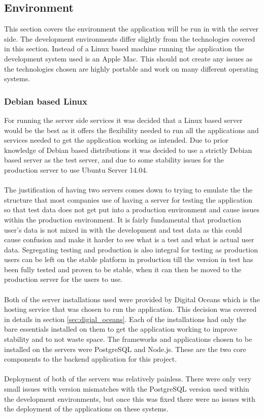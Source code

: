 \subsection{Environment}

This section covers the environment the application will be run in with the server side. The development environments differ slightly from the technologies covered in this section. Instead of a Linux based machine running the application the development system used is an Apple Mac. This should not create any issues as the technologies chosen are highly portable and work on many different operating systems.

\subsubsection{Debian based Linux}
\label{sec:debian_server}

For running the server side services it was decided that a Linux based server would be the best as it offers the flexibility needed to run all the applications and services needed to get the application working as intended. Due to prior knowledge of Debian based distributions it was decided to use a strictly Debian based server as the test server, and due to some stability issues for the production server to use Ubuntu Server 14.04.\\
\\
The justification of having two servers comes down to trying to emulate the the structure that most companies use of having a server for testing the application so that test data does not get put into a production environment and cause issues within the production environment. It is fairly fundamental that production user's data is not mixed in with the development and test data as this could cause confusion and make it harder to see what is a test and what is actual user data. Segregating testing and production is also integral for testing as production users can be left on the stable platform in production till the version in test has been fully tested and proven to be stable, when it can then be moved to the production server for the users to use.\\
\\
Both of the server installations used were provided by Digital Oceans which is the hosting service that was chosen to run the application. This decision was covered in details in section \ref{sec:digial_oceans}. Each of the installations had only the bare essentials installed on them to get the application working to improve stability and to not waste space. The frameworks and applications chosen to be installed on the servers were PostgreSQL and Node.js. These are the two core components to the backend application for this project.\\
\\
Deployment of both of the servers was relatively painless. There were only very small issues with version mismatches with the PostgreSQL version used within the development environments, but once this was fixed there were no issues with the deployment of the applications on these systems.

